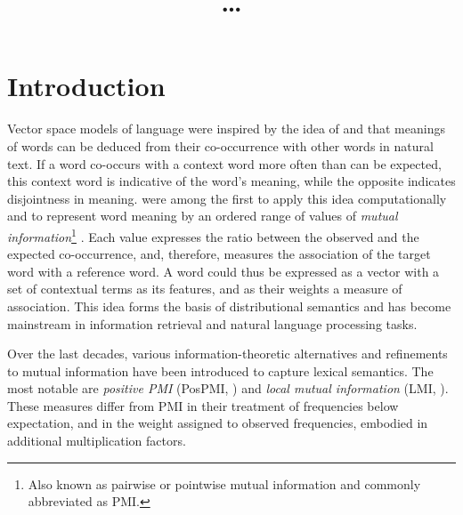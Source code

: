 \documentclass[11pt,letterpaper]{article}
\title{\ldots}
\date{}
\begin{document}
\def\emnlp/{\textit{KS2013}}
\def\PhraseRel/{PhraseRel}

\def\PMI/{$1 \operatorname{PMI}$}
\def\SPMI/{$1 \operatorname{SPMI}$}
\def\CPMI/{$1 \operatorname{CPMI}$}
\def\SCPMI/{$1 \operatorname{SCPMI}$}

\def\NPMI/{$n \operatorname{PMI}$}
\def\NSPMI/{$n \operatorname{SPMI}$}
\def\NCPMI/{$n \operatorname{CPMI}$}
\def\NSCPMI/{$n \operatorname{SCPMI}$}

\def\logNPMI/{$\log n\operatorname{PMI}$}
\def\logNSPMI/{$\log n\operatorname{SPMI}$}
\def\logNCPMI/{$\log n \operatorname{CPMI}$}
\def\logNSCPMI/{$\log n \operatorname{SCPMI}$}


\maketitle
\begin{abstract}

\end{abstract}

\section{Introduction}
\label{sec:introduction}

Vector space models of language were inspired by the idea of  and  that meanings of words can be deduced from their co-occurrence with other words in natural text. If a word co-occurs with a context word more often than can be expected, this context word is indicative of the word's meaning, while the opposite indicates disjointness in meaning.
 were among the first to apply this idea computationally and to represent word meaning by an ordered range of values of
\emph{mutual information}\footnote{Also known as pairwise or pointwise mutual information and commonly abbreviated as PMI.} \cite{church1990word}.
Each value expresses the ratio between the observed and the expected co-occurrence, and, therefore, measures the association of the target word with a reference word. A word could thus be expressed as a vector with a set of contextual terms as its features, and as their weights a measure of association. This idea forms the basis of distributional semantics and has become mainstream in information retrieval and natural language processing tasks.

Over the last decades, various information-theoretic alternatives and refinements to mutual information have been introduced to capture lexical semantics. The most notable are \emph{positive PMI} (PosPMI, ) and \emph{local mutual information} (LMI, ).
These measures differ from PMI in their treatment of frequencies below expectation, and in the weight assigned to observed frequencies, embodied in additional multiplication factors.
\end{document}
